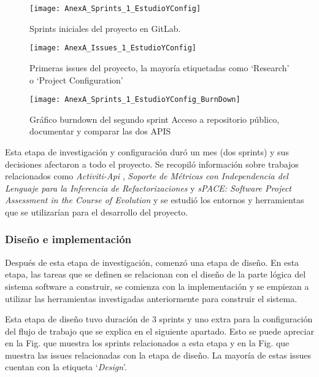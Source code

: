 \begin{figure}[!h]
	\centering
	\texttt{[image: AnexA\_Sprints\_1\_EstudioYConfig]}
	\caption{Sprints iniciales del proyecto en GitLab.}
	\label{fig:AnexA_Sprints_1_EstudioYConfig}
\end{figure}
\FloatBarrier

\begin{figure}[!h]
	\centering
	\texttt{[image: AnexA\_Issues\_1\_EstudioYConfig]}
	\caption{Primeras issues del proyecto, la mayoría etiquetadas como `Research' o `Project Configuration'}
	\label{fig:AnexA_Issues_1_EstudioYConfig}
\end{figure}
\FloatBarrier

\begin{figure}[!h]
	\centering
	\texttt{[image: AnexA\_Sprints\_1\_EstudioYConfig\_BurnDown]}
	\caption{Gráfico burndown del segundo sprint Acceso a repositorio público, documentar y comparar las dos APIS}
	\label{fig:AnexA_Sprints_1_EstudioYConfig_BurnDown}
\end{figure}
\FloatBarrier

Esta etapa de investigación y configuración duró un mes (dos sprints) y sus decisiones afectaron a todo el proyecto. Se recopiló información sobre trabajos relacionados como \textit{Activiti-Api} \cite{rlp0019_software_2019}, \textit{Soporte de Métricas con Independencia del Lenguaje para la Inferencia de Refactorizaciones}  \cite{marticorena_soporte_2005} y \textit{sPACE: Software Project Assessment in the Course of Evolution} \cite{ratzinger_space:_2007} y se estudió los entornos y herramientas que se utilizarían para el desarrollo del proyecto.

\subsubsection{Diseño e implementación}

Después de esta etapa de investigación, comenzó una etapa de diseño. En esta etapa, las tareas que se definen se relacionan con el diseño de la parte lógica del sistema software a construir, se comienza con la implementación y se empiezan a utilizar las herramientas investigadas anteriormente para construir el sistema. 

Esta etapa de diseño tuvo duración de 3 sprints y uno extra para la configuración del flujo de trabajo que se explica en el siguiente apartado. Esto se puede apreciar en la Fig.  que muestra los sprints relacionados a esta etapa y en la Fig. que muestra las issues relacionadas con la etapa de diseño. La mayoría de estas issues cuentan con la etiqueta `\textit{Design}'.

